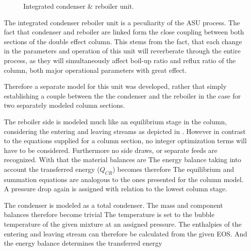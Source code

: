        \begin{figure}
            \center
            
            \caption{Integrated condenser \& reboiler unit.}
            \label{fig:mathpro:conreb_ss}
        \end{figure}

        The integrated condenser reboiler unit is a peculiarity of the ASU process. The fact that condenser and
        reboiler are linked form the close coupling between both sections of the double effect column.
        This stems from the fact, that each change in the parameters and operation of this unit will reverberate
        through the entire process, as they will simultaneously affect boil-up ratio and reflux
        ratio of the column, both major operational parameters with great effect.

        Therefore a separate model for this unit was developed, rather that simply establishing a couple between the
        the condenser and the reboiler in the case for two separately modeled column sections.

        The reboiler side is modeled much like an equilibrium stage in the column, considering the entering
        and leaving streams as depicted in . However in contrast to the
        equations supplied for a column section, no integer optimization terms will have to be considered.
        Furthermore no side draws, or separate feeds are recognized. With that the material balances are
        The energy balance taking into account the transferred energy ($Q_{CR}$) becomes therefore
        The equilibrium and summation equations are analogous to the ones presented for the column model.
        A pressure drop again is assigned with relation to the lowest column stage.

        The condenser is modeled as a total condenser. The mass and component balances therefore become trivial
        The temperature is set to the bubble temperature of the given mixture at an assigned pressure. The
        enthalpies of the entering and leaving stream can therefore be calculated from the given EOS. And
        the energy balance determines the transferred energy
